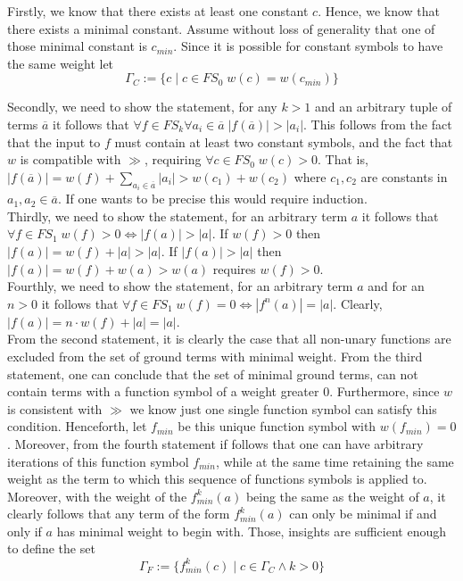 \documentclass[11pt,a4paper]{article}
\begin{document}
Firstly, we know that there exists at least one constant $c$. Hence, we know that there exists a minimal constant. Assume without loss of generality that one of those minimal constant is $c_{min}$.  Since it is possible for constant symbols to have the same weight let 
\begin{equation*}
\Gamma_C := \{c \mid c \in \mathit{FS}_0 \;  w(c)=w(c_{min}) \}
\end{equation*}


Secondly, we need to show the statement, for any $k> 1$ and an arbitrary tuple of terms $\overline{a}$ it follows that $\forall f \in \mathit{FS}_k \forall a_i \in \overline{a} \;| f(\overline{a}) |> |a_i|$. 
This follows from the fact that the input to $f$ must contain at least two constant symbols, and the fact that $w$ is compatible with $\gg$, requiring $\forall c \in \mathit{FS}_0 \; w(c)>0$.  That is, $|f(\overline{a})|= w(f) + \sum_{a_i \in \overline{a}} |a_i| > w(c_1) + w(c_2)$ where $c_1, c_2$ are constants in $a_1, a_2 \in \overline{a}$.  If one wants to be precise this would require induction. \\

Thirdly, we need to show the statement, for an arbitrary term $a$ it follows that $\forall f \in \mathit{FS}_1 \; w(f)>0  \Leftrightarrow |f(a)| > |a|$. 
If $w(f)>0$ then $|f(a)|=w(f) + |a| > |a|$. If $ |f(a)| > |a|$ then $|f(a)|=w(f) + w(a) > w(a)$ requires $w(f) > 0$. \\

Fourthly, we need to show the statement, for an arbitrary term $a$ and for an $n > 0$ it follows that $\forall f \in \mathit{FS}_1 \; w(f)=0  \Leftrightarrow |f^n(a)| = |a|$.  Clearly, $|f(a)|=n \cdot w(f)+ |a| = |a|$. \\


From the second statement, it is clearly the case that all non-unary functions are excluded from the set of ground terms with minimal weight.
From the third statement, one can conclude that the set of minimal ground terms, can not contain terms with a function symbol of a weight greater 0.
Furthermore, since $w$ is consistent with $\gg$ we know just one single function symbol can satisfy this condition. Henceforth, let $f_{min}$ be this unique function symbol with $w(f_{min})=0$. Moreover, from the fourth statement if follows that one can have arbitrary iterations of this function symbol $f_{min}$, while at the same time retaining the same weight as the term to which this sequence of functions symbols is applied to. Moreover, with the weight of the $f_{min}^k(a)$ being the same as the weight of $a$, it clearly follows that any term of the form $f_{min}^k(a)$ can only be minimal if and only if $a$ has minimal weight to begin with. Those, insights are sufficient enough to define the set 
\begin{equation*}
\Gamma_F:= \{f_{min}^k(c) \mid  c \in \Gamma_C  \land k > 0\}
\end{equation*}
\end{document}
